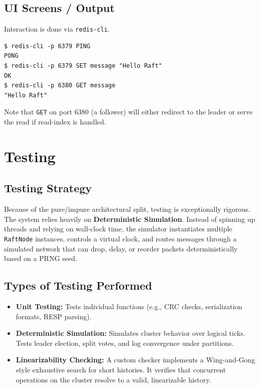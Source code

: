 \documentclass[12pt,a4paper]{report}
\begin{document}
\section{UI Screens / Output}
Interaction is done via \texttt{redis-cli}.
\begin{lstlisting}[caption=Redis CLI Interaction]
$ redis-cli -p 6379 PING
PONG
$ redis-cli -p 6379 SET message "Hello Raft"
OK
$ redis-cli -p 6380 GET message
"Hello Raft"
\end{lstlisting}
Note that \texttt{GET} on port 6380 (a follower) will either redirect to the leader or serve the read if read-index is handled.


\chapter{Testing}

\section{Testing Strategy}
Because of the pure/impure architectural split, testing is exceptionally rigorous. The system relies heavily on \textbf{Deterministic Simulation}. Instead of spinning up threads and relying on wall-clock time, the simulator instantiates multiple \texttt{RaftNode} instances, controls a virtual clock, and routes messages through a simulated network that can drop, delay, or reorder packets deterministically based on a PRNG seed.

\section{Types of Testing Performed}
\begin{itemize}
    \item \textbf{Unit Testing:} Tests individual functions (e.g., CRC checks, serialization formats, RESP parsing).
    \item \textbf{Deterministic Simulation:} Simulates cluster behavior over logical ticks. Tests leader election, split votes, and log convergence under partitions.
    \item \textbf{Linearizability Checking:} A custom checker implements a Wing-and-Gong style exhaustive search for short histories. It verifies that concurrent operations on the cluster resolve to a valid, linearizable history.
\end{itemize}
\end{document}
